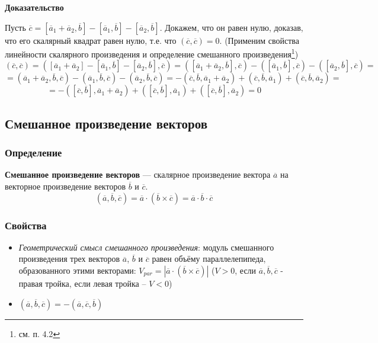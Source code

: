 \documentclass{article}
\newcommand{\n}{\bigbreak}
\begin{document}
\textbf{Доказательство}

Пусть $\overline{c}=[\overline{a}_1+\overline{a}_2,\overline{b}]-[\overline{a}_1,\overline{b}]-[\overline{a}_2,\overline{b}]$. Докажем, что он равен нулю, доказав, что его скалярный квадрат равен нулю, т.е. что $(\overline{c},\overline{c})=0$. (Применим свойства линейности скалярного произведения и определение смешанного произведения\footnote{см. п. 4.2})
$$ (\overline{c},\overline{c})=([\overline{a}_1+\overline{a}_2]-[\overline{a}_1,\overline{b}]-[\overline{a}_2,\overline{b}],\overline{c})=([\overline{a}_1+\overline{a}_2,\overline{b}],\overline{c})-([\overline{a}_1,\overline{b}],\overline{c})-([\overline{a}_2,\overline{b}],\overline{c})= $$
$$ =(\overline{a}_1+\overline{a}_2,\overline{b},\overline{c})-(\overline{a}_1,\overline{b},\overline{c})-(\overline{a}_2,\overline{b},\overline{c}) =-(\overline{c},\overline{b},\overline{a}_1+\overline{a}_2)+(\overline{c},\overline{b},\overline{a}_1)+(\overline{c},\overline{b},\overline{a}_2)=$$
$$ =-([\overline{c},\overline{b}],\overline{a}_1+\overline{a}_2)+([\overline{c},\overline{b}],\overline{a}_1)+([\overline{c},\overline{b}],\overline{a}_2)=0 $$
\n 
\n 
\n 
\subsection{Смешанное произведение векторов}
\subsubsection{Определение}
\textbf{Смешанное произведение векторов} — скалярное произведение вектора $\overline{a}$ на
векторное произведение векторов  $\overline{b}$ и $\overline{c}$. $$(\overline{a},\overline{b},\overline{c})=\overline{a}\cdot(\overline{b}\times\overline{c})=\overline{a}\cdot\overline{b}\cdot\overline{c}$$
\subsubsection{Свойства}
\begin{itemize}
    \item  \textit{Геометрический смысл смешанного произведения}: модуль смешанного произведения трех векторов $\overline{a}$, $\overline{b}$ и  $\overline{c}$ равен объёму параллелепипеда, образованного этими векторами: $V_{par}=|\overline{a}\cdot(\overline{b}\times\overline{c})|$ ($V>0$, если $\overline{a},\overline{b},\overline{c}$ - правая тройка, если левая тройка -- $V<0$)
    \item $(\overline{a},\overline{b},\overline{c})=-(\overline{a},\overline{c},\overline{b})$
\end{itemize}
\end{document}
